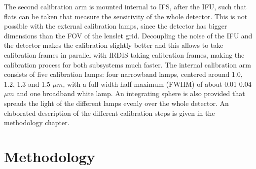 \documentclass[twoside,single,12pt]{lion-msc}
\begin{document}
The second calibration arm is mounted internal to IFS, after the IFU, such that flats can be taken that measure the sensitivity of the whole detector. This is not possible with the external calibration lamps, since the detector has bigger dimensions than the FOV of the lenslet grid. Decoupling the noise of the IFU and the detector makes the calibration slightly better and this allows to take calibration frames in parallel with IRDIS taking calibration frames, making the calibration process for both subsystems much faster. The internal calibration arm consists of five calibration lamps: four narrowband lamps, centered around 1.0, 1.2, 1.3 and 1.5 $\mu m$, with a full width half maximum (FWHM) of about 0.01-0.04 $\mu m$ and one broadband white lamp\citep{Desidera2008}. An integrating sphere is also provided that spreads the light of the different lamps evenly over the whole detector. An elaborated description of the different calibration steps is given in the methodology chapter.

\chapter{Methodology}
\end{document}

